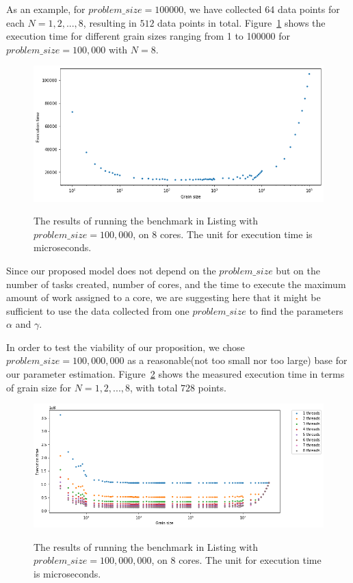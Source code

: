 As an example, for $problem\_{size}=100000$, we have collected 64 data points for each $N=1,2,...,8$, resulting in $512$ data points in total. Figure~\ref{fig41} shows the execution time for different grain sizes ranging from 1 to 100000 for $problem\_{size}=100,000$ with $N=8$.



\begin{figure}[H]
	\centering
	{\includegraphics[scale=.45]{images/hpx_for_loop/100000_8.png}}
	\caption{The results of running the benchmark in Listing with $problem\_size=100,000$, on 8 cores. The unit for execution time is microseconds.}\label{fig41}		
\end{figure}


Since our proposed model does not depend on the $problem\_{size}$ but on the number of tasks created, number of cores, and the time to execute the maximum amount of work assigned to a core, we are suggesting here that it might be sufficient to use the data collected from one $problem\_{size}$ to find the parameters $\alpha$ and $\gamma$. 

In order to test the viability of our proposition, we chose $problem\_{size}=100,000,000$ as a reasonable(not too small nor too large) base for our parameter estimation. Figure~\ref{fig42} shows the measured execution time in terms of grain size for $N=1,2,...,8$, with total $728$ points.
  
\begin{figure}[H]
	\centering
	{\includegraphics[scale=.45]{images/hpx_for_loop/100000000_8.png}}
	\caption{The results of running the benchmark in Listing with $problem\_size=100,000,000$, on 8 cores. The unit for execution time is microseconds.}\label{fig42}		
\end{figure}

